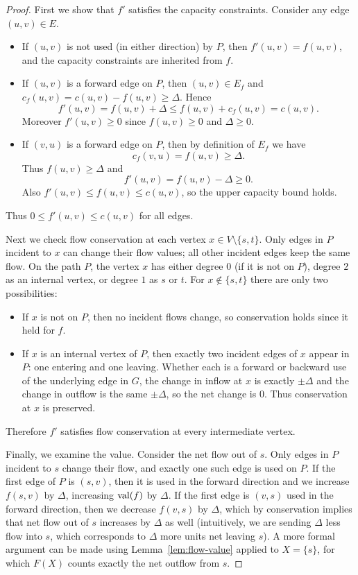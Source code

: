 \documentclass[11pt]{article}
\begin{document}
\begin{proof}
First we show that $f'$ satisfies the capacity constraints. Consider any edge
$(u,v)\in E$.
\begin{itemize}[itemsep=0.2em]
  \item If $(u,v)$ is not used (in either direction) by $P$, then $f'(u,v)=f(u,v)$,
        and the capacity constraints are inherited from $f$.
  \item If $(u,v)$ is a forward edge on $P$, then $(u,v)\in E_f$ and
        $c_f(u,v)=c(u,v)-f(u,v) \ge \Delta$. Hence
        \[
          f'(u,v) = f(u,v)+\Delta \le f(u,v) + c_f(u,v) = c(u,v).
        \]
        Moreover $f'(u,v)\ge 0$ since $f(u,v)\ge 0$ and $\Delta\ge 0$.
  \item If $(v,u)$ is a forward edge on $P$, then by definition of $E_f$ we have
        \[
          c_f(v,u) = f(u,v) \ge \Delta.
        \]
        Thus $f(u,v) \ge \Delta$ and
        \[
          f'(u,v) = f(u,v) - \Delta \ge 0.
        \]
        Also $f'(u,v)\le f(u,v)\le c(u,v)$, so the upper capacity bound holds.
\end{itemize}
Thus $0\le f'(u,v)\le c(u,v)$ for all edges.

Next we check flow conservation at each vertex $x\in V\setminus\{s,t\}$.
Only edges in $P$ incident to $x$ can change their flow values; all other
incident edges keep the same flow. On the path $P$, the vertex $x$ has either
degree $0$ (if it is not on $P$), degree $2$ as an internal vertex, or degree
$1$ as $s$ or $t$. For $x\notin\{s,t\}$ there are only two possibilities:
\begin{itemize}[itemsep=0.2em]
  \item If $x$ is not on $P$, then no incident flows change, so conservation
        holds since it held for $f$.
  \item If $x$ is an internal vertex of $P$, then exactly two incident edges
        of $x$ appear in $P$: one entering and one leaving. Whether each is a
        forward or backward use of the underlying edge in $G$, the change
        in inflow at $x$ is exactly $\pm\Delta$ and the change in outflow is
        the same $\pm\Delta$, so the net change is $0$. Thus conservation at
        $x$ is preserved.
\end{itemize}
Therefore $f'$ satisfies flow conservation at every intermediate vertex.

Finally, we examine the value. Consider the net flow out of $s$. Only edges in
$P$ incident to $s$ change their flow, and exactly one such edge is used on $P$.
If the first edge of $P$ is $(s,v)$, then it is used in the forward direction
and we increase $f(s,v)$ by $\Delta$, increasing $\mathrm{val}(f)$ by $\Delta$. If the
first edge is $(v,s)$ used in the forward direction, then we decrease $f(v,s)$
by $\Delta$, which by conservation implies that net flow out of $s$ increases
by $\Delta$ as well (intuitively, we are sending $\Delta$ less flow into $s$,
which corresponds to $\Delta$ more units net leaving $s$). A more formal
argument can be made using Lemma~\ref{lem:flow-value} applied to $X=\{s\}$,
for which $F(X)$ counts exactly the net outflow from $s$.


\end{proof}
\end{document}

